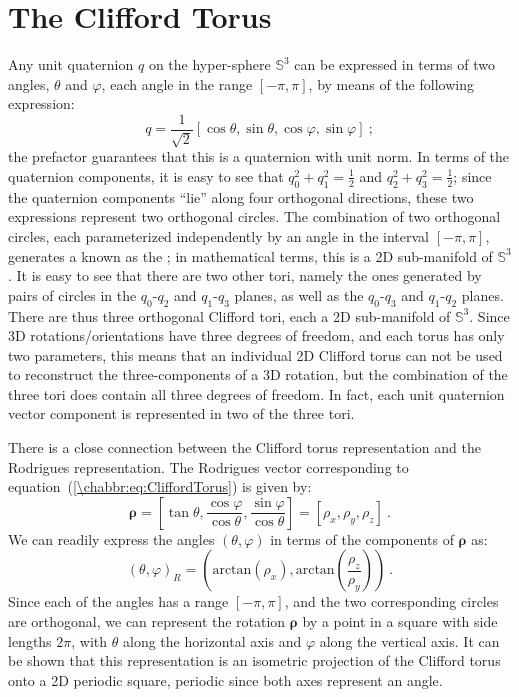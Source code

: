 \section{The Clifford Torus}\label{\chabbr:sec:CliffordTorus}
Any unit quaternion $q$ on the hyper-sphere $\mathbb{S}^3$ can be expressed in terms of two angles, $\theta$ and $\varphi$, each angle in the range $[-\pi,\pi]$, by means of the following expression:
\begin{equation}
	q = \frac{1}{\sqrt{2}}[\cos\theta,\sin\theta,\cos\varphi,\sin\varphi]\ ;\label{\chabbr:eq:CliffordTorus}
\end{equation}
the prefactor guarantees that this is a quaternion with unit norm. In terms of the quaternion components, it is easy to see that $q_0^2+q_1^2=\frac{1}{2}$ and $q_2^2+q_3^2=\frac{1}{2}$; since the quaternion components ``lie'' along four orthogonal directions, these two expressions represent two orthogonal circles. The combination of two orthogonal circles, each parameterized independently by an angle in the interval $[-\pi,\pi]$, generates a  known as the ; in mathematical terms, this is a 2D sub-manifold of $\mathbb{S}^3$.  It is easy to see that there are two other tori, namely the ones generated by pairs of circles in the $q_0$-$q_2$ and $q_1$-$q_3$ planes, as well as the $q_0$-$q_3$ and $q_1$-$q_2$ planes. There are thus three orthogonal Clifford tori, each a 2D sub-manifold of $\mathbb{S}^3$.  Since 3D rotations/orientations have three degrees of freedom, and each torus has only two parameters, this means that an individual 2D Clifford torus can not be used to reconstruct the three-components of a 3D rotation, but the combination of the three tori does contain all three degrees of freedom.  In fact, each unit quaternion vector component is represented in two of the three tori.

There is a close connection between the Clifford torus representation and the Rodrigues representation. The Rodrigues vector corresponding to equation~(\ref{\chabbr:eq:CliffordTorus}) is given by:
\begin{equation}
	\bm{\rho} = \left[ \tan\theta, \frac{\cos\varphi}{\cos\theta},\frac{\sin\varphi}{\cos\theta}\right]=\left[\rho_x,\rho_y,\rho_z\right]\ .
\end{equation}
We can readily express the angles $(\theta,\varphi)$ in terms of the components of $\bm{\rho}$ as:
\begin{equation}
	(\theta,\varphi)_R = \left(\text{arctan}(\rho_x), \text{arctan}\left(\frac{\rho_z}{\rho_y}\right)\right)\ .
\end{equation}
Since each of the angles has a range $[-\pi,\pi]$, and the two corresponding circles are orthogonal, we can represent the rotation $\bm{\rho}$ by a point in a square with side lengths $2\pi$, with $\theta$ along the horizontal axis and $\varphi$ along the vertical axis.  It can be shown that this representation is an isometric projection of the Clifford torus onto a 2D periodic square, periodic since both axes represent an angle.  

